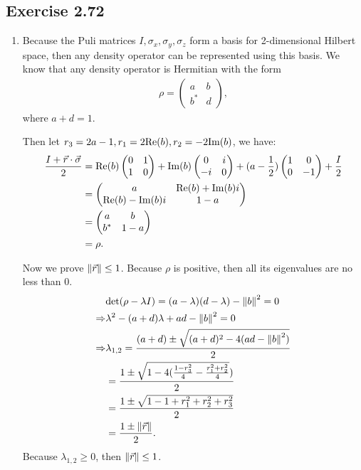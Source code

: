 \subsection*{Exercise 2.72}
\begin{enumerate}[(1)]
    \item Because the Puli matrices $I,\sigma_x, \sigma_y, \sigma_z$ form a basis for 2-dimensional Hilbert space, then any density operator can be represented using this basis. We know that any density operator is Hermitian with the form 
\begin{align}
\rho = \begin{pmatrix}
a & b \\ b^* &d
\end{pmatrix},
\end{align}
where $a+d=1$.

Then let $r_3 = 2a-1, r_1=2{\rm Re}(b), r_2 = -2{\rm Im}(b)$, we have:
\begin{align}
\frac{I+\vec r\cdot \vec \sigma}{2} &= {\rm Re}(b)\begin{pmatrix}
0& 1\\ 1 & 0
\end{pmatrix}
+{\rm Im}(b)\begin{pmatrix}
0& i\\ -i & 0
\end{pmatrix}
+(a-\frac{1}{2})\begin{pmatrix}
1& 0\\ 0 & -1
\end{pmatrix}+\frac{I}{2}\\
&=\begin{pmatrix}
a & {\rm Re}(b)+{\rm Im}(b)i\\
{\rm Re}(b)-{\rm Im}(b)i & 1-a
\end{pmatrix}\\
&=\begin{pmatrix}
a & b\\b^* & 1-a
\end{pmatrix}\\
&= \rho.
\end{align}

Now we prove $\norm{\vec r}\leq 1$. Because $\rho$ is positive, then all its eigenvalues are no less than $0$. 
\begin{align}
&{\rm det}(\rho - \lambda I)=(a-\lambda)(d-\lambda)-\norm{b}^2=0\\
\Rightarrow& \lambda^2-(a+d)\lambda+ad-\norm{b}^2=0\\
\Rightarrow& \lambda_{1,2} = \frac{(a+d)\pm\sqrt{(a+d)^2-4(ad-\norm{b}^2)}}{2}\\
&=\frac{1\pm\sqrt{1-4(\frac{1-r_3^2}{4}-\frac{r_1^2+r_2^2}{4}})}{2}\\
&=\frac{1\pm\sqrt{1-1+r_1^2+r_2^2+r_3^2}}{2}\\
&=\frac{1\pm \norm{\vec r}}{2}.
\end{align}
Because $\lambda_{1,2}\geq 0$, then $\norm{\vec r}\leq 1$.


\end{enumerate}
